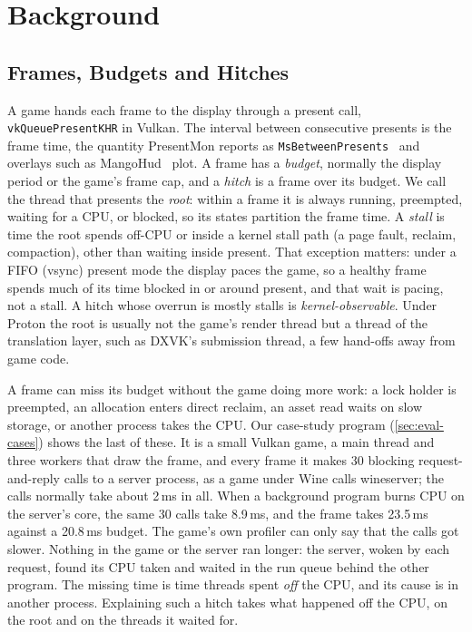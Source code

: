 \section{Background}
\label{sec:background}

\subsection{Frames, Budgets and Hitches}
\label{sec:frames}

A game hands each frame to the display through a present call,
\texttt{vkQueuePresentKHR} in Vulkan. The interval between consecutive
presents is the frame time, the quantity PresentMon reports as
\texttt{MsBetweenPresents}~\cite{presentmon} and overlays such as
MangoHud~\cite{mangohud} plot. A frame has a \emph{budget}, normally the
display period or the game's frame cap, and a \emph{hitch} is a frame over
its budget. We call the thread that presents the \emph{root}: within a
frame it is always running, preempted, waiting for a CPU, or blocked, so
its states partition the frame time. A \emph{stall} is time the root
spends off-CPU or inside a kernel stall path (a page fault, reclaim,
compaction), other than waiting inside present. That exception matters:
under a FIFO (vsync) present mode the display paces the game, so a healthy
frame spends much of its time blocked in or around present, and that wait
is pacing, not a stall. A hitch whose overrun is mostly stalls is
\emph{kernel-observable}. Under Proton the root is usually not the game's
render thread but a thread of the translation layer, such as DXVK's
submission thread, a few hand-offs away from game code. 

\label{sec:example}
A frame can miss its budget without the game doing more work: a lock
holder is preempted, an allocation enters direct reclaim, an asset read
waits on slow storage, or another process takes the CPU. Our case-study
program (\autoref{sec:eval-cases}) shows the last of these. It is a small
Vulkan game, a main thread and three workers that draw the frame, and
every frame it makes 30 blocking request-and-reply calls to a server
process, as a game under Wine calls wineserver; the calls normally take
about 2\,ms in all. When a background program burns CPU on the server's
core, the same 30 calls take 8.9\,ms, and the frame takes 23.5\,ms against
a 20.8\,ms budget. The game's own profiler can only say that the calls got
slower. Nothing in the game or the server ran longer: the server, woken by
each request, found its CPU taken and waited in the run queue behind the
other program. The missing time is time threads spent \emph{off} the CPU,
and its cause is in another process. Explaining such a hitch takes what
happened off the CPU, on the root and on the threads it waited for.

